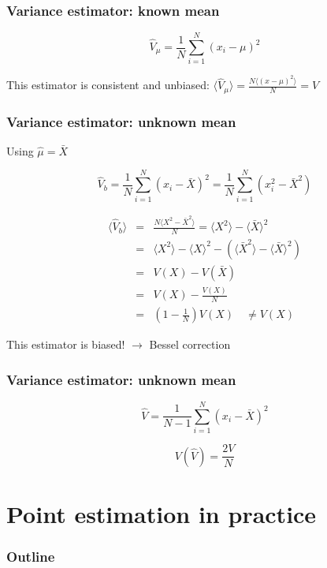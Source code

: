 \documentclass[9pt]{beamer}
\begin{document}
\begin{frame}
 \frametitle{Variance estimator: known mean}
 
 $$\hat{V}_\mu = \frac{1}{N} \sum_{i=1}^N (x_i-\mu)^2$$
 
 This estimator is consistent and unbiased: $\langle \hat{V}_\mu \rangle = \frac{N\langle (x-\mu)^2 \rangle}{N} = V$
\end{frame}

\begin{frame}
 \frametitle{Variance estimator: unknown mean}
 
 Using $\hat{\mu} = \bar{X}$
 
 $$\hat{V}_b = \frac{1}{N} \sum_{i=1}^N (x_i-\bar{X})^2 = \frac{1}{N} \sum_{i=1}^N (x_i^2 - \bar{X}^2)$$
 
 \begin{eqnarray}
  \langle \hat{V}_b \rangle & = & \frac{N \langle X^2 - \bar{X}^2 \rangle}{N} = \langle X^2 \rangle - \langle \bar{X} \rangle^2 \nonumber \\
  & = & \langle X^2 \rangle - \langle X \rangle^2 - \left( \langle \bar{X}^2 \rangle - \langle \bar{X} \rangle ^2 \right) \nonumber \\
  & = & V(X) - V(\bar{X}) \nonumber \\
  & = & V(X) - \frac{V(X)}{N} \nonumber \\
  & = & \left( 1 - \frac{1}{N} \right) V(X)\quad \neq V(X) \nonumber
 \end{eqnarray}
 
 This estimator is biased! $\rightarrow$ Bessel correction

\end{frame}

\begin{frame}
 \frametitle{Variance estimator: unknown mean}

 \begin{block}{}
  $$\hat{V} = \frac{1}{N-1} \sum_{i=1}^N (x_i - \bar{X})^2$$
 \end{block}
 
 $$V(\hat{V}) = \frac{2V}{N}$$

\end{frame}

\section{Point estimation in practice}

\begin{frame}
 \frametitle{Outline}
 
 \tableofcontents[current]
\end{frame}
\end{document}
